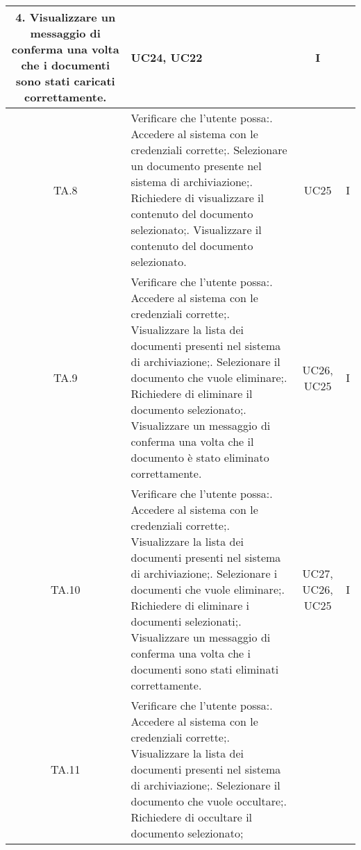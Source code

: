 {{{{{{{{\begin{xltabular}{\textwidth}{|c|X|c|c|}
    4. Visualizzare un messaggio di conferma una volta che i documenti sono stati caricati correttamente. & UC24, UC22 & I \\
    \hline
    TA.8 & Verificare che l'utente possa:. Accedere al sistema con le credenziali corrette;. Selezionare un documento presente nel sistema di archiviazione;. Richiedere di visualizzare il contenuto del documento selezionato;. Visualizzare il contenuto del documento selezionato. & UC25 & I \\
    \hline
    TA.9 & Verificare che l'utente possa:. Accedere al sistema con le credenziali corrette;. Visualizzare la lista dei documenti presenti nel sistema di archiviazione;. Selezionare il documento che vuole eliminare;. Richiedere di eliminare il documento selezionato;. Visualizzare un messaggio di conferma una volta che il documento è stato eliminato correttamente. & UC26, UC25 & I \\
    \hline
    TA.10 & Verificare che l'utente possa:. Accedere al sistema con le credenziali corrette;. Visualizzare la lista dei documenti presenti nel sistema di archiviazione;. Selezionare i documenti che vuole eliminare;. Richiedere di eliminare i documenti selezionati;. Visualizzare un messaggio di conferma una volta che i documenti sono stati eliminati correttamente. & UC27, UC26, UC25 & I \\
    \hline
    TA.11 & Verificare che l'utente possa:. Accedere al sistema con le credenziali corrette;. Visualizzare la lista dei documenti presenti nel sistema di archiviazione;. Selezionare il documento che vuole occultare;. Richiedere di occultare il documento selezionato;\newline

\end{xltabular}}}}}}}}}
